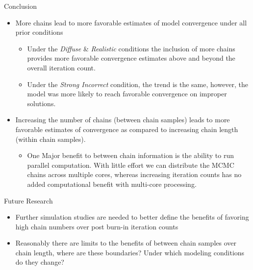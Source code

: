 \documentclass[final,hyperref={pdfpagelabels=false}]{beamer}
\begin{document}
\begin{frame}[t]
\begin{columns}[t]
\begin{column}{.465\textwidth}
\begin{block}{Conclusion}
\begin{itemize}
\item More chains lead to more favorable estimates of model convergence under all prior conditions
\begin{itemize}
\item Under the \emph{Diffuse} \& \emph{Realistic} conditions the inclusion of more chains provides more favorable convergence estimates above and beyond the overall iteration count. 
\item Under the \emph{Strong Incorrect} condition, the trend is the same, however, the model was more likely to reach favorable convergence on  improper solutions.
\end{itemize}
\item Increasing the number of chains (between chain samples) leads to more favorable estimates of convergence as compared to increasing chain length (within chain samples).
\begin{itemize}
\item One Major benefit to between chain information is the ability to run parallel computation. With little effort we can distribute the MCMC chains across multiple cores, whereas increasing iteration counts has no added computational benefit with multi-core processing. 
\end{itemize}
\end{itemize}

\end{block}





\begin{block}{Future Research}
	
	\begin{itemize}
		\item Further simulation studies are needed to better define the benefits of favoring high chain numbers over post burn-in iteration counts
			
		\item Reasonably there are limits to the benefits of between chain samples over chain length, where are these boundaries? Under which modeling conditions do they change?
			

	\end{itemize}
	
\end{block}




\end{column}
\end{columns}
\end{frame}
\end{document}
